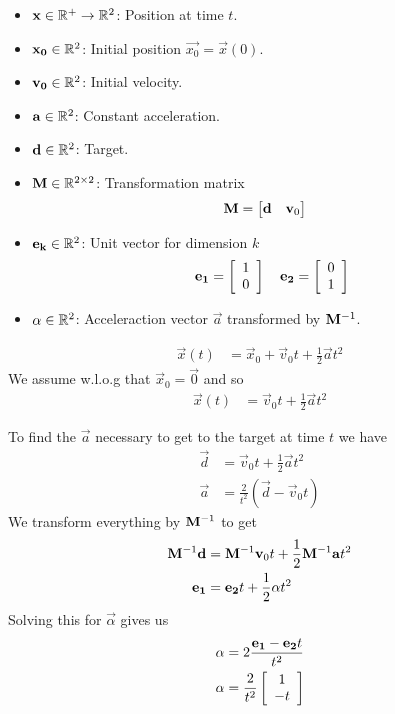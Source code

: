 \documentclass[main.tex]{subfiles}
\begin{document}
\begin{itemize}
    \item $\mathbf{x}\in\mathbb{R}^+\to\mathbb{R}^2$: Position at time $t$.
    \item $\mathbf{x_0}\in\mathbb{R}^2$: Initial position $\vec{x_0}=\vec x(0)$.
    \item $\mathbf{v_0}\in\mathbb{R}^2$: Initial velocity.
    \item $\mathbf{a}\in\mathbb{R}^2$: Constant acceleration.
    \item $\mathbf{d}\in\mathbb{R}^2$: Target.
    \item $\mathbf{M}\in\mathbb{R}^{2\times2}$: Transformation matrix \begin{align*}
        \mathbf{M} &= \begin{bmatrix}
            \mathbf{d} & \mathbf{v}_0
        \end{bmatrix}
    \end{align*}
    \item $\mathbf{e_k}\in\mathbb{R}^2$: Unit vector for dimension $k$ \begin{align*}
        \vec {e_1}=\cvec{1}{0}\quad\vec {e_2}=\cvec{0}{1}
    \end{align*}
    \item $\mathbf{\alpha}\in\mathbb{R}^2$: Acceleraction vector $\vec a$ transformed by $\mathbf{M}^{-1}$.
\end{itemize}

\begin{align*}
    \vec x(t) &= \vec x_0 + \vec v_0 t + \frac{1}{2}\vec a t^2
\end{align*}
We assume w.l.o.g that $\vec x_0=\vec 0$ and so
\begin{align*}
    \vec x(t) &= \vec v_0 t + \frac{1}{2}\vec a t^2
\end{align*}
    
To find the $\vec a$ necessary to get to the target at time $t$ we have
\begin{align*}
    \vec d &= \vec v_0 t + \frac{1}{2}\vec a t^2\\
    \vec a &= \frac{2}{t^2}(\vec d - \vec v_0 t)
\end{align*}
We transform everything by $\mathbf{M}^{-1}$ to get
\begin {align*}
    \mathbf{M}^{-1}\mathbf{d} &= \mathbf{M}^{-1}\mathbf{v}_0 t + \frac{1}{2}\mathbf{M}^{-1}\mathbf{a} t^2\\
    \mathbf{e_1} &=\mathbf{e_2}t+\frac12\mathbf{\alpha}t^2
\end{align*}
Solving this for $\vec\alpha$ gives us
\begin{align*}
    \vec\alpha &= 2\frac{\vec{e_1}-\vec{e_2}t}{t^2}\\
    \vec\alpha &= \frac{2}{t^2}\cvec{1}{-t}
\end{align*}
\end{document}
